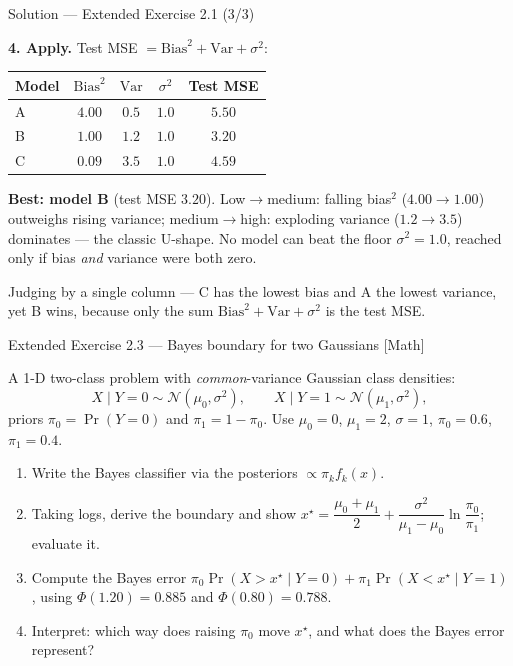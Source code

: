 \documentclass[aspectratio=169,11pt]{beamer}
\begin{document}
\begin{frame}{Solution --- Extended Exercise 2.1 (3/3)}
\begin{solutionbox}
\textbf{4. Apply.} Test MSE $=\mathrm{Bias}^2+\mathrm{Var}+\sigma^2$:
\vspace{-1mm}
\begin{center}\footnotesize
\begin{tabular}{lcccc}
\toprule
Model & $\mathrm{Bias}^2$ & $\mathrm{Var}$ & $\sigma^2$ & Test MSE \\
\midrule
A & $4.00$ & $0.5$ & $1.0$ & $\mathbf{5.50}$ \\
B & $1.00$ & $1.2$ & $1.0$ & $\mathbf{3.20}$ \\
C & $0.09$ & $3.5$ & $1.0$ & $\mathbf{4.59}$ \\
\bottomrule
\end{tabular}
\end{center}
\vspace{-1mm}
\textbf{Best: model B} (test MSE $3.20$). Low$\to$medium: falling bias$^2$ ($4.00\to1.00$) outweighs rising variance; medium$\to$high: exploding variance ($1.2\to3.5$) dominates --- the classic U-shape. No model can beat the floor $\sigma^2=1.0$, reached only if bias \emph{and} variance were both zero.
\end{solutionbox}
\begin{mistake}
Judging by a single column --- C has the lowest bias and A the lowest variance, yet B wins, because only the sum $\mathrm{Bias}^2+\mathrm{Var}+\sigma^2$ is the test MSE.
\end{mistake}
\end{frame}

\begin{frame}{Extended Exercise 2.3 --- Bayes boundary for two Gaussians [Math]}
\begin{longexercise}
A 1-D two-class problem with \emph{common}-variance Gaussian class densities:
\[
X\mid Y{=}0\sim\mathcal N(\mu_0,\sigma^2),\qquad X\mid Y{=}1\sim\mathcal N(\mu_1,\sigma^2),
\]
priors $\pi_0=\Pr(Y{=}0)$ and $\pi_1=1-\pi_0$. Use $\mu_0=0$, $\mu_1=2$, $\sigma=1$, $\pi_0=0.6$, $\pi_1=0.4$.
\begin{enumerate}\setlength\itemsep{1pt}
  \item Write the Bayes classifier via the posteriors $\propto\pi_k f_k(x)$.
  \item Taking logs, derive the boundary and show $x^\star=\dfrac{\mu_0+\mu_1}{2}+\dfrac{\sigma^2}{\mu_1-\mu_0}\ln\dfrac{\pi_0}{\pi_1}$; evaluate it.
  \item Compute the Bayes error $\pi_0\Pr(X{>}x^\star\mid Y{=}0)+\pi_1\Pr(X{<}x^\star\mid Y{=}1)$, using $\Phi(1.20)=0.885$ and $\Phi(0.80)=0.788$.
  \item Interpret: which way does raising $\pi_0$ move $x^\star$, and what does the Bayes error represent?
\end{enumerate}
\end{longexercise}
\end{frame}
\end{document}
